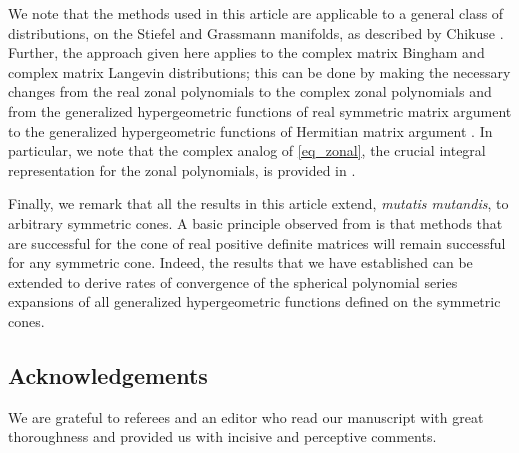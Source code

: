 \documentclass[pdftex]{sigma}
\numberwithin{equation}{section}
\begin{document}
We note that the methods used in this article are applicable to a general class of distributions, on the Stiefel and Grassmann manifolds, as described by Chikuse \cite[pp.~35--36]{Chikuse}. Further, the approach given here applies to the complex matrix Bingham and complex matrix Langevin distributions; this can be done by making the necessary changes from the real zonal polynomials to the complex zonal polynomials and from the generalized hypergeometric functions of real symmetric matrix argument to the generalized hypergeometric functions of Hermitian matrix argument \cite{James64}. In particular, we note that the complex analog of \eqref{eq_zonal}, the crucial integral representation for the zonal polynomials, is provided in \cite[Theorem 4.8]{GrossRichards}.

Finally, we remark that all the results in this article extend, {\em mutatis mutandis}, to arbitrary symmetric cones. A basic principle observed from \cite{DingGrossRichards,GrossRichards} is that methods that are successful for the cone of real positive definite matrices will remain successful for any symmetric cone. Indeed, the results that we have established can be extended to derive rates of convergence of the spherical polynomial series expansions of all generalized hypergeometric functions defined on the symmetric cones.


\subsection*{Acknowledgements}

We are grateful to referees and an editor who read our manuscript with great thoroughness and provided us with incisive and perceptive comments.
\end{document}
